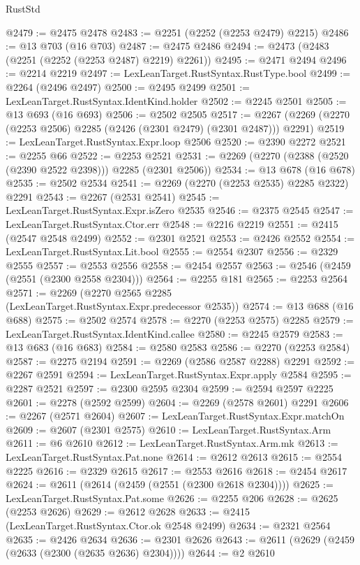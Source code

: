 \begin{lexlean}{RustStd}
\begin{coremodule}
@2479 := @2475 @2478
@2483 := @2251 (@2252 (@2253 @2479) @2215)
@2486 := @13 @703 (@16 @703)
@2487 := @2475 @2486
@2494 := @2473 (@2483 (@2251 (@2252 (@2253 @2487) @2219) @2261))
@2495 := @2471 @2494
@2496 := @2214 @2219
@2497 := LexLeanTarget.RustSyntax.RustType.bool
@2499 := @2264 (@2496 @2497)
@2500 := @2495 @2499
@2501 := LexLeanTarget.RustSyntax.IdentKind.holder
@2502 := @2245 @2501
@2505 := @13 @693 (@16 @693)
@2506 := @2502 @2505
@2517 := @2267 (@2269 (@2270 (@2253 @2506) @2285 (@2426 (@2301 @2479) (@2301 @2487))) @2291)
@2519 := LexLeanTarget.RustSyntax.Expr.loop @2506
@2520 := @2390 @2272
@2521 := @2255 @66
@2522 := @2253 @2521
@2531 := @2269 (@2270 (@2388 (@2520 (@2390 @2522 @2398))) @2285 (@2301 @2506))
@2534 := @13 @678 (@16 @678)
@2535 := @2502 @2534
@2541 := @2269 (@2270 (@2253 @2535) @2285 @2322) @2291
@2543 := @2267 (@2531 @2541)
@2545 := LexLeanTarget.RustSyntax.Expr.isZero @2535
@2546 := @2375 @2545
@2547 := LexLeanTarget.RustSyntax.Ctor.err
@2548 := @2216 @2219
@2551 := @2415 (@2547 @2548 @2499)
@2552 := @2301 @2521
@2553 := @2426 @2552
@2554 := LexLeanTarget.RustSyntax.Lit.bool
@2555 := @2554 @2307
@2556 := @2329 @2555
@2557 := @2553 @2556
@2558 := @2454 @2557
@2563 := @2546 (@2459 (@2551 (@2300 @2558 @2304)))
@2564 := @2255 @181
@2565 := @2253 @2564
@2571 := @2269 (@2270 @2565 @2285 (LexLeanTarget.RustSyntax.Expr.predecessor @2535))
@2574 := @13 @688 (@16 @688)
@2575 := @2502 @2574
@2578 := @2270 (@2253 @2575) @2285
@2579 := LexLeanTarget.RustSyntax.IdentKind.callee
@2580 := @2245 @2579
@2583 := @13 @683 (@16 @683)
@2584 := @2580 @2583
@2586 := @2270 (@2253 @2584)
@2587 := @2275 @2194
@2591 := @2269 (@2586 @2587 @2288) @2291
@2592 := @2267 @2591
@2594 := LexLeanTarget.RustSyntax.Expr.apply @2584
@2595 := @2287 @2521
@2597 := @2300 @2595 @2304
@2599 := @2594 @2597 @2225
@2601 := @2278 (@2592 @2599)
@2604 := @2269 (@2578 @2601) @2291
@2606 := @2267 (@2571 @2604)
@2607 := LexLeanTarget.RustSyntax.Expr.matchOn
@2609 := @2607 (@2301 @2575)
@2610 := LexLeanTarget.RustSyntax.Arm
@2611 := @6 @2610
@2612 := LexLeanTarget.RustSyntax.Arm.mk
@2613 := LexLeanTarget.RustSyntax.Pat.none
@2614 := @2612 @2613
@2615 := @2554 @2225
@2616 := @2329 @2615
@2617 := @2553 @2616
@2618 := @2454 @2617
@2624 := @2611 (@2614 (@2459 (@2551 (@2300 @2618 @2304))))
@2625 := LexLeanTarget.RustSyntax.Pat.some
@2626 := @2255 @206
@2628 := @2625 (@2253 @2626)
@2629 := @2612 @2628
@2633 := @2415 (LexLeanTarget.RustSyntax.Ctor.ok @2548 @2499)
@2634 := @2321 @2564
@2635 := @2426 @2634
@2636 := @2301 @2626
@2643 := @2611 (@2629 (@2459 (@2633 (@2300 (@2635 @2636) @2304))))
@2644 := @2 @2610

\end{coremodule}
\end{lexlean}
